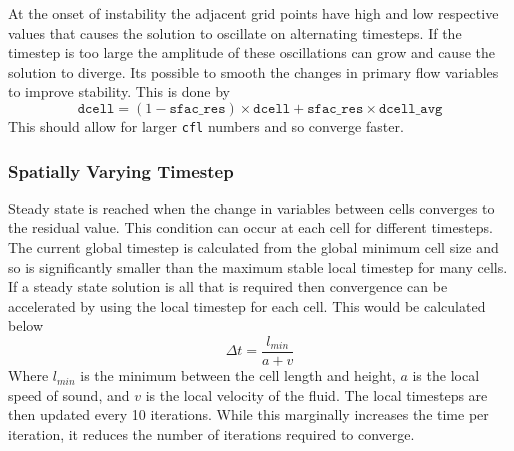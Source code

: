 \documentclass{article}
\begin{document}
At the onset of instability the adjacent grid points have high and low respective values that causes the solution to oscillate on alternating timesteps.
If the timestep is too large the amplitude of these oscillations can grow and cause the solution to diverge.
Its possible to smooth the changes in primary flow variables to improve stability.
This is done by
\begin{equation}
    \texttt{dcell} = (1 - \texttt{sfac\_res}) \times \texttt{dcell} + \texttt{sfac\_res} \times \texttt{dcell\_avg}
\end{equation}
This should allow for larger \texttt{cfl} numbers and so converge faster. 

\subsubsection{Spatially Varying Timestep}

Steady state is reached when the change in variables between cells converges to the residual value.
This condition can occur at each cell for different timesteps.
The current global timestep is calculated from the global minimum cell size and so is significantly smaller than the maximum stable local timestep for many cells.
If a steady state solution is all that is required then convergence can be accelerated by using the local timestep for each cell.
This would be calculated below
\begin{equation}
    \Delta t = \frac{l_{min}}{a + v}
\end{equation}
Where $l_{min}$ is the minimum between the cell length and height, $a$ is the local speed of sound, and $v$ is the local velocity of the fluid.
The local timesteps are then updated every 10 iterations.
While this marginally increases the time per iteration, it reduces the number of iterations required to converge.
\end{document}
